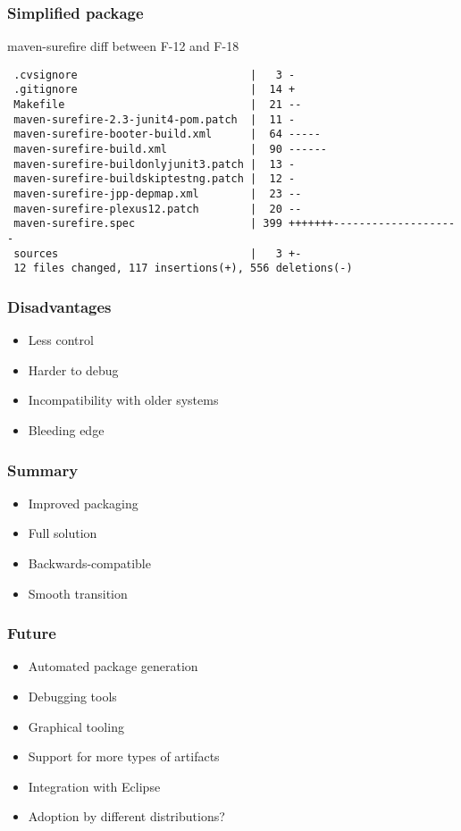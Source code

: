 \documentclass[pdftex,unicode,xcolor=table]{beamer}
\begin{document}
\begin{frame}[fragile]
  \frametitle{Simplified package}
  \begin{block}{maven-surefire diff between F-12 and F-18}
    \scriptsize
\begin{verbatim}
 .cvsignore                           |   3 -
 .gitignore                           |  14 +
 Makefile                             |  21 --
 maven-surefire-2.3-junit4-pom.patch  |  11 -
 maven-surefire-booter-build.xml      |  64 -----
 maven-surefire-build.xml             |  90 ------
 maven-surefire-buildonlyjunit3.patch |  13 -
 maven-surefire-buildskiptestng.patch |  12 -
 maven-surefire-jpp-depmap.xml        |  23 --
 maven-surefire-plexus12.patch        |  20 --
 maven-surefire.spec                  | 399 +++++++--------------------
 sources                              |   3 +-
 12 files changed, 117 insertions(+), 556 deletions(-)
\end{verbatim}
  \end{block}
\end{frame}

\begin{frame}
  \frametitle{Disadvantages}
  \begin{itemize}
    \item Less control
    \item Harder to debug
    \item Incompatibility with older systems
    \item Bleeding edge
  \end{itemize}
\end{frame}

\begin{frame}
  \frametitle{Summary}
  \begin{itemize}
    \item Improved packaging
    \item Full solution
    \item Backwards-compatible
    \item Smooth transition
  \end{itemize}
\end{frame}


\begin{frame}
  \frametitle{Future}
  \begin{itemize}
    \item Automated package generation
    \item Debugging tools
    \item Graphical tooling
    \item Support for more types of artifacts
    \item Integration with Eclipse
    \item Adoption by different distributions?
  \end{itemize}
\end{frame}



 {
  \Rhbg{\frame{\theend}}
}
\end{document}
